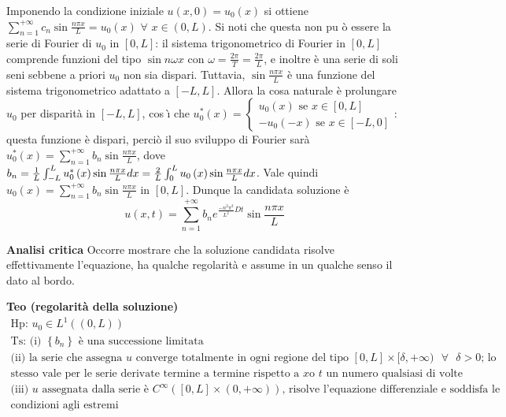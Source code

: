 \documentclass{article}
\begin{document}
Imponendo la condizione iniziale $u\left( x,0\right) =u_{0}\left( x\right) $
si ottiene $\sum_{n=1}^{+\infty }c_{n}\sin \frac{n\pi x}{L}=u_{0}\left(
x\right) $ $\forall $ $x\in \left( 0,L\right) $. Si noti che questa non pu%
\`{o} essere la serie di Fourier di $u_{0}$ in $\left[ 0,L\right] $: il
sistema trigonometrico di Fourier in $\left[ 0,L\right] $ comprende funzioni
del tipo $\sin n\omega x$ con $\omega =\frac{2\pi }{T}=\frac{2\pi }{L}$, e
inoltre \`{e} una serie di soli seni sebbene a priori $u_{0}$ non sia
dispari. Tuttavia, $\sin \frac{n\pi x}{L}$ \`{e} una funzione del sistema
trigonometrico adattato a $\left[ -L,L\right] $. Allora la cosa naturale 
\`{e} prolungare $u_{0}$ per disparit\`{a} in $\left[ -L,L\right] $, cos%
\`{\i} che $u_{0}^{\ast }\left( x\right) =\left\{ 
\begin{array}{c}
u_{0}\left( x\right) \text{ se }x\in \left[ 0,L\right] \\ 
-u_{0}\left( -x\right) \text{ se }x\in \left[ -L,0\right]%
\end{array}%
\right. $: questa funzione \`{e} dispari, perci\`{o} il suo sviluppo di
Fourier sar\`{a} $u_{0}^{\ast }\left( x\right) =\sum_{n=1}^{+\infty
}b_{n}\sin \frac{n\pi x}{L}$, dove $b_{n}=\frac{1}{L}\int_{-L}^{L}u_{0}^{%
\ast }\left( x\right) \sin \frac{n\pi x}{L}dx=\frac{2}{L}\int_{0}^{L}u_{0}%
\left( x\right) \sin \frac{n\pi x}{L}dx$. Vale quindi $u_{0}\left( x\right)
=\sum_{n=1}^{+\infty }b_{n}\sin \frac{n\pi x}{L}$ in $\left[ 0,L\right] $.
Dunque la candidata soluzione \`{e} 
\begin{equation*}
u\left( x,t\right) =\sum_{n=1}^{+\infty }b_{n}e^{\frac{-n^{2}\pi ^{2}}{L^{2}}%
Dt}\sin \frac{n\pi x}{L}
\end{equation*}

\textbf{Analisi critica} Occorre mostrare che la soluzione candidata risolve
effettivamente l'equazione, ha qualche regolarit\`{a} e assume in un qualche
senso il dato al bordo.

\textbf{Teo (regolarit\`{a} della soluzione)}%
\begin{gather*}
\text{Hp: }u_{0}\in L^{1}\left( \left( 0,L\right) \right) \\
\text{Ts: (i) }\left\{ b_{n}\right\} \text{ \`{e} una successione limitata}
\\
\text{(ii) la serie che assegna }u\text{ converge totalmente in ogni regione
del tipo }\left[ 0,L\right] \times \lbrack \delta ,+\infty )\text{ }\forall 
\text{ }\delta >0\text{; lo } \\
\text{stesso vale per le serie derivate termine a termine rispetto a }x\text{
o }t\text{ un numero qualsiasi di volte} \\
\text{(iii) }u\text{ assegnata dalla serie \`{e} }C^{\infty }\left( \left[
0,L\right] \times \left( 0,+\infty \right) \right) \text{, risolve
l'equazione differenziale e soddisfa le} \\
\text{condizioni agli estremi}
\end{gather*}
\end{document}
